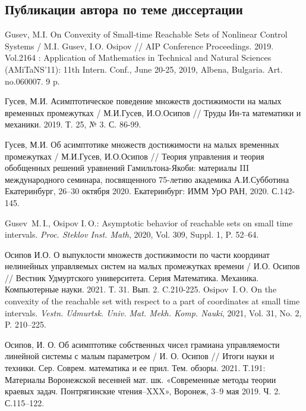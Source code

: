 \documentclass[../main.tex]{subfiles}
\begin{document}
\clearpage
\begin{thebibliography}{99}
    \subsection*{Публикации автора по теме диссертации}


    Gusev, M.I. 
    On Convexity of Small-time Reachable Sets of Nonlinear Control Systems / 
    M.I. Gusev, I.O. Osipov // 
    AIP Conference Proceedings. 
    2019. 
    Vol.2164 : 
    Application of Mathematics in Technical and Natural Sciences (AMiTaNS’11): 
    11th Intern. Conf., 
    June 20-25, 2019, Albena, Bulgaria. 
    Art. no.060007. 9 p.

    Гусев, М.И. 
    Асимптотическое поведение множеств достижимости на малых временных промежутках / 
    М.И.Гусев, И.О.Осипов // 
    Труды Ин-та математики и механики. 
    2019. Т. 25, № 3. С. 86-99. 
    
    Гусев, М.И. 
    Об асимптотике множеств достижимости на малых временных промежутках / 
    М.И.Гусев, И.О.Осипов // 
    Теория управления и теория обобщенных решений уравнений Гамильтона-Якоби: материалы III международного семинара, посвященного 75-летию академика А.И.Субботина 
    Екатеринбург, 26–30 октября 2020. 
    Екатеринбург: ИММ УрО РАН, 2020. С.142-145.

    Gusev~M.\,I., Osipov I.\,O.: Asymptotic behavior of reachable sets on small time intervals. \emph{Proc. Steklov Inst. Math}, 2020, Vol. 309, Suppl. 1, P. 52--64.  

    Осипов И.О. 
    О выпуклости множеств достижимости по части координат нелинейных управляемых систем на малых промежутках времени / 
    И.О. Осипов // 
    Вестник Удмуртского университета. Серия Математика. Механика. Компьютерные науки. 
    2021. Т. 31. Вып. 2. C.210-225.
    Osipov~I.\,O. On the convexity of the reachable set with respect to a part of coordinates at small time intervals. 
    \emph{Vestn. Udmurtsk. Univ. Mat. Mekh. Komp. Nauki}, 2021,  Vol. 31, No. 2, P. 210--225.

    Осипов, И. О. 
    Об асимптотике собственных чисел грамиана управляемости линейной системы с малым параметром / 
    И. О. Осипов // 
    Итоги науки и техники. Сер. Соврем. математика и ее прил. Тем. обзоры. 
    2021. Т.191: Материалы Воронежской весенней мат. шк. «Современные методы теории краевых задач. Понтрягинские чтения–XXX», 
    Воронеж, 3–9 мая 2019. Ч. 2. С.115–122.


\end{thebibliography}
\end{document}
